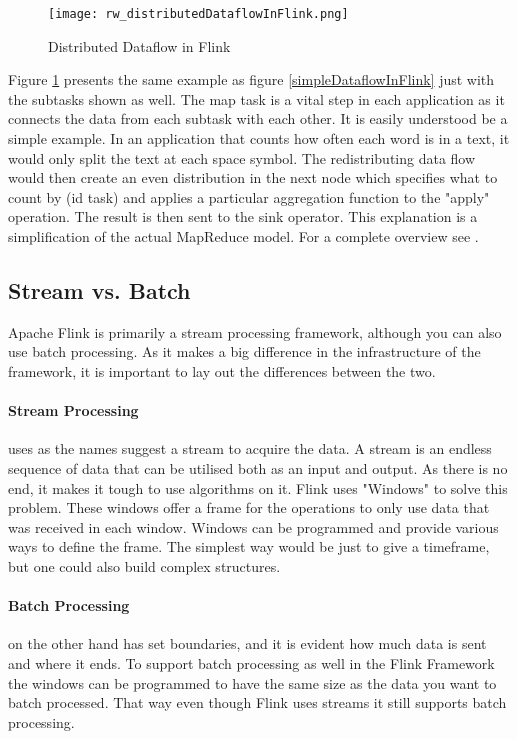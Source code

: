 \begin{figure}[h!]
    \centering
      \texttt{[image: rw\_distributedDataflowInFlink.png]}
      \caption{Distributed Dataflow in Flink}
      \label{distributedDataflowInFlink}
\end{figure}

Figure \ref{distributedDataflowInFlink} presents the same example as figure \ref{simpleDataflowInFlink} just with the subtasks shown as well. The map task is a vital step in each application as it connects the data from each subtask with each other. It is easily understood be a simple example. In an application that counts how often each word is in a text, it would only split the text at each space symbol. The redistributing data flow would then create an even distribution in the next node which specifies what to count by (id task) and applies a particular aggregation function to the "apply" operation. The result is then sent to the sink operator. This explanation is a simplification of the actual MapReduce model. For a complete overview see \cite{todo}.

\subsection{Stream vs. Batch}

Apache Flink is primarily a stream processing framework, although you can also use batch processing. As it makes a big difference in the infrastructure of the framework, it is important to lay out the differences between the two.

\paragraph{Stream Processing} uses as the names suggest a stream to acquire the data. A stream is an endless sequence of data that can be utilised both as an input and output. As there is no end, it makes it tough to use algorithms on it. Flink uses "Windows" to solve this problem. These windows offer a frame for the operations to only use data that was received in each window. Windows can be programmed and provide various ways to define the frame. The simplest way would be just to give a timeframe, but one could also build complex structures.

\paragraph{Batch Processing} on the other hand has set boundaries, and it is evident how much data is sent and where it ends. To support batch processing as well in the Flink Framework the windows can be programmed to have the same size as the data you want to batch processed. That way even though Flink uses streams it still supports batch processing.
